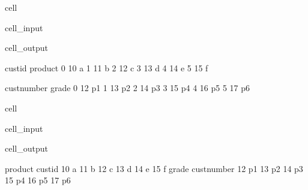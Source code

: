 \documentclass[letterpaper,10pt,english]{jupyterBook}
\begin{document}
\begin{sphinxuseclass}{cell}
\begin{sphinxVerbatimInput}
\begin{sphinxuseclass}{cell_input}
\end{sphinxuseclass}\end{sphinxVerbatimInput}
\begin{sphinxVerbatimOutput}

\begin{sphinxuseclass}{cell_output}
\begin{sphinxVerbatim}[commandchars=\\\{\}]
   cust\PYGZus{}id product
0       10       a
1       11       b
2       12       c
3       13       d
4       14       e
5       15       f


   cust\PYGZus{}number grade
0           12    p1
1           13    p2
2           14    p3
3           15    p4
4           16    p5
5           17    p6
\end{sphinxVerbatim}

\end{sphinxuseclass}\end{sphinxVerbatimOutput}

\end{sphinxuseclass}


\begin{sphinxuseclass}{cell}\begin{sphinxVerbatimInput}

\begin{sphinxuseclass}{cell_input}
\begin{sphinxVerbatim}[commandchars=\\\{\}]
\end{sphinxVerbatim}

\end{sphinxuseclass}\end{sphinxVerbatimInput}
\begin{sphinxVerbatimOutput}

\begin{sphinxuseclass}{cell_output}
\begin{sphinxVerbatim}[commandchars=\\\{\}]
        product
cust\PYGZus{}id        
10            a
11            b
12            c
13            d
14            e
15            f
            grade
cust\PYGZus{}number      
12             p1
13             p2
14             p3
15             p4
16             p5
17             p6
\end{sphinxVerbatim}

\end{sphinxuseclass}\end{sphinxVerbatimOutput}

\end{sphinxuseclass}
\end{document}
